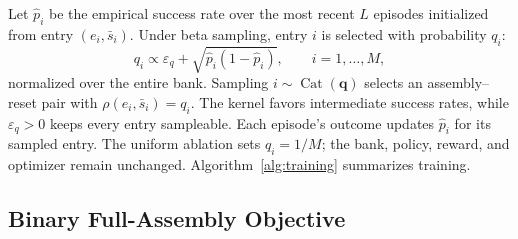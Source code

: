 Let $\hat{p}_i$ be the empirical success rate over the most recent $L$ episodes
initialized from entry $(e_i,\bar{s}_i)$. Under beta sampling, entry $i$ is
selected with probability $q_i$:
\begin{equation}
    q_i\propto \varepsilon_q+
    \sqrt{\hat{p}_i(1-\hat{p}_i)},\qquad i=1,\ldots,M,
    \label{eq:beta-sampling}
\end{equation}
normalized over the entire bank. Sampling $i\sim\operatorname{Cat}(\mathbf q)$
selects an assembly--reset pair with $\rho(e_i,\bar{s}_i)=q_i$.
The kernel favors intermediate success rates, while $\varepsilon_q>0$
keeps every entry sampleable. Each episode's outcome updates $\hat{p}_i$
for its sampled entry.
The uniform ablation sets $q_i=1/M$; the bank, policy, reward, and
optimizer remain unchanged.
Algorithm~\ref{alg:training} summarizes training.

\subsection{Binary Full-Assembly Objective}

